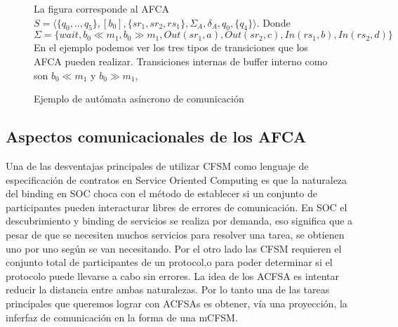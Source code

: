 \documentclass[paper=a4, fontsize=11pt, spanish]{scrartcl} %
\numberwithin{equation}{section} %
\numberwithin{figure}{section} %
\numberwithin{table}{section} %
\begin{document}
\begin{figure}[ht]
\label{ex:afca}
\begin{center}
\end{center}
La figura corresponde al AFCA $S= \langle \{q_0,..,q_5\},[b_0],\{sr_1,sr_2,rs_1\}, \Sigma_A, \delta_A, q_0, \{q_4\} \rangle$. Donde $\Sigma =\{wait, b_0 \ll m_1,b_0 \gg m_1, Out(sr_1,a),Out(sr_2,c), In(rs_1,b),In(rs_2,d) \}$ En el ejemplo podemos ver los tres tipos de transiciones que los AFCA pueden realizar. Transiciones internas de buffer interno como son $b_0 \ll m_1$ y $b_0 \gg m_1$, 
\caption{Ejemplo de autómata asíncrono de comunicación}
\label{fig:ejemplo-aa}
\end{figure}





\subsection{Aspectos comunicacionales de los AFCA}

Una de las desventajas principales de utilizar CFSM como lenguaje de especificación de contratos en Service Oriented Computing es que la naturaleza del binding en SOC choca con el método de establecer si un conjunto de participantes pueden interacturar libres de errores de comunicación. En SOC el descubrimiento y binding de servicios se realiza por demanda, eso significa que a pesar de que se necesiten muchos servicios para resolver una tarea, se obtienen uno por uno según se van necesitando. Por el otro lado las CFSM requieren el conjunto total de participantes de un protocol,o para poder determinar si el protocolo puede llevarse a cabo sin errores. La idea de los ACFSA es intentar reducir la distancia entre ambas naturalezas. Por lo tanto una de las tareas principales que queremos lograr con ACFSAs es obtener, vía una proyección, la inferfaz de comunicación en la forma de una mCFSM.
\end{document}
